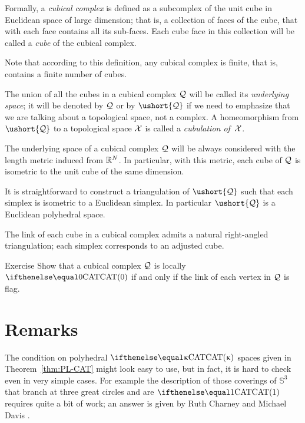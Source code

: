 Formally, a \emph{cubical complex} is defined as a subcomplex 
of the unit cube in Euclidean space of large dimension;
that is, a collection of faces of the cube, that with each face contains all its sub-faces.
Each cube face in this collection 
will be called a {}\emph{cube} of the cubical complex.

Note that according to this definition, 
any cubical complex is finite,
that is, contains a finite number of cubes.

The union of all the cubes in a cubical complex $\mathcal{Q}$ will be called its \emph{underlying space};
it will be denoted by $\mathcal{Q}$ or by $\ushort{\spc{Q}}$ 
if we need to emphasize that we are talking about a topological space, 
not a complex.
A homeomorphism from $\ushort{\spc{Q}}$ to a topological space $\mathcal{X}$ is called a \emph{cubulation of}~$\mathcal{X}$.

The underlying space of a cubical complex $\mathcal{Q}$ will be always considered with the length metric
induced from $\mathbb{R}^N$.
In particular, with this metric, 
each cube of $\mathcal{Q}$ is isometric to the unit cube of the same dimension.

It is straightforward to construct a triangulation 
of $\ushort{\spc{Q}}$ 
such that each simplex is isometric to a Euclidean simplex.
In particular $\ushort{\spc{Q}}$ is a Euclidean polyhedral space.

The link of each cube in a cubical complex admits a natural right-angled triangulation; 
each simplex corresponds to an adjusted cube.

\begin{thm}{Exercise}\label{ex:cubical-complex}
Show that a cubical complex $\mathcal{Q}$ is locally $\CAT0$ if and only if the link of each vertex in $\mathcal{Q}$ is flag.
\end{thm}

\section{Remarks}

The condition on polyhedral $\CAT\kappa$ spaces given in Theorem~\ref{thm:PL-CAT} might look easy to use, 
but in fact, it is hard to check even in very simple cases.
For example the description of those coverings of $\mathbb{S}^3$ that branch at three 
great circles and are $\CAT1$ requires quite a bit of work;
an answer is given by Ruth Charney and Michael Davis \cite{charney-davis-1993}.

